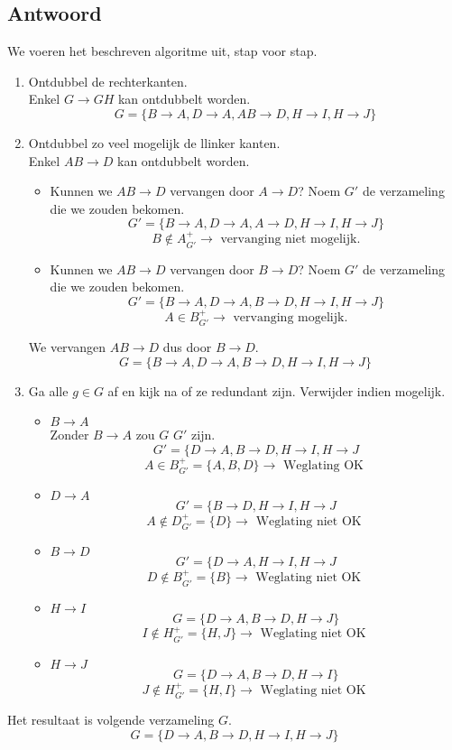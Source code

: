\documentclass[normaalvormen.tex]{subfiles}
\begin{document}
\subsection{Antwoord}
We voeren het beschreven algoritme uit, stap voor stap.
\begin{enumerate}
\item Ontdubbel de rechterkanten.\\
Enkel $G \rightarrow GH$ kan ontdubbelt worden.
\[
G = \{ B\rightarrow A, D\rightarrow A, AB \rightarrow D, H\rightarrow I, H\rightarrow J\}
\]
\item Ontdubbel zo veel mogelijk de llinker kanten.\\
Enkel $AB \rightarrow D$ kan ontdubbelt worden.
\begin{itemize}
\item Kunnen we $AB\rightarrow D$ vervangen door $A\rightarrow D$?
Noem $G'$ de verzameling die we zouden bekomen.
\[
G' = \{ B\rightarrow A, D\rightarrow A, A \rightarrow D, H\rightarrow I, H\rightarrow J\}
\]
\[
B \not\in A_{G'}^{+} \rightarrow \text{ vervanging niet mogelijk.}
\]
\item Kunnen we $AB\rightarrow D$ vervangen door $B\rightarrow D$?
Noem $G'$ de verzameling die we zouden bekomen.
\[
G' = \{ B\rightarrow A, D\rightarrow A, B \rightarrow D, H\rightarrow I, H\rightarrow J\}
\]
\[
A \in B_{G'}^{+} \rightarrow \text{ vervanging mogelijk.}
\]
\end{itemize}
We vervangen $AB\rightarrow D$ dus door $B\rightarrow D$.
\[
G = \{ B\rightarrow A, D\rightarrow A, B \rightarrow D, H\rightarrow I, H\rightarrow J\}
\]

\item Ga alle $g\in G$ af en kijk na of ze redundant zijn. Verwijder indien mogelijk.
\begin{itemize}
\item $B\rightarrow A$\\
Zonder $B\rightarrow A$ zou $G$ $G'$ zijn.
\[
G' = \{D\rightarrow A, B\rightarrow D, H\rightarrow I, H\rightarrow J
\] 
\[
A \in B_{G'}^{+} = \{A,B,D\} \rightarrow \text{ Weglating OK }
\]
\item $D\rightarrow A$
\[
G' = \{B\rightarrow D, H\rightarrow I, H\rightarrow J
\]
\[
A \not\in D_{G'}^{+} = \{D\} \rightarrow \text{ Weglating niet OK }
\]
\item $B\rightarrow D$
\[
G' = \{D\rightarrow A, H\rightarrow I, H\rightarrow J
\]
\[
D \not\in B_{G'}^{+} = \{B\} \rightarrow \text{ Weglating niet OK }
\]
\item $H\rightarrow I$
\[
G = \{D\rightarrow A, B \rightarrow D, H\rightarrow J\}
\]
\[
I \not\in H_{G'}^{+} = \{H,J\} \rightarrow \text{ Weglating niet OK }
\]
\item $H\rightarrow J$
\[
G = \{D\rightarrow A, B \rightarrow D, H\rightarrow I\}
\]
\[
J \not\in H_{G'}^{+} = \{H,I\} \rightarrow \text{ Weglating niet OK }
\]
\end{itemize}
\end{enumerate}
Het resultaat is volgende verzameling $G$.
\[
G = \{D\rightarrow A, B \rightarrow D, H\rightarrow I, H\rightarrow J\}
\]
\end{document}
